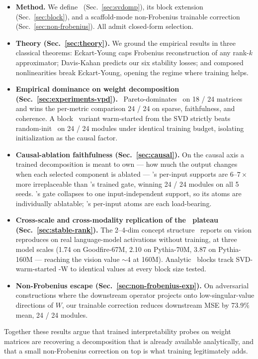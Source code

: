 \begin{itemize}[leftmargin=1.5em, topsep=0.2em, itemsep=0.2em]
\item \textbf{Method.} We define \svdomp\ (Sec.\ \ref{sec:svdomp}), its block extension (Sec.\ \ref{sec:block}), and a scaffold-mode non-Frobenius trainable correction (Sec.\ \ref{sec:non-frobenius}). All admit closed-form selection.

\item \textbf{Theory (Sec.\ \ref{sec:theory}).} We ground the empirical results in three classical theorems: Eckart-Young caps Frobenius reconstruction of any rank-$k$ approximator; Davis-Kahan predicts our six stability losses; and composed nonlinearities break Eckart-Young, opening the regime where training helps.

\item \textbf{Empirical dominance on weight decomposition (Sec.\ \ref{sec:experiments-vpd}).} \svdomp\ Pareto-dominates \vpd\ on 18 / 24 matrices and wins the per-metric comparison 24 / 24 on sparse, faithfulness, and coherence. A block \bsf\ variant warm-started from the SVD strictly beats random-init \bsf\ on 24 / 24 modules under identical training budget, isolating initialization as the causal factor.

\item \textbf{Causal-ablation faithfulness (Sec.\ \ref{sec:causal}).} On the causal axis a trained decomposition is meant to own --- how much the output changes when each selected component is ablated --- \svdomp's per-input supports are $6$--$7\times$ more irreplaceable than \vpd's trained gate, winning 24 / 24 modules on all 5 seeds. \vpd's gate collapses to one input-independent support, so its atoms are individually ablatable; \svdomp's per-input atoms are each load-bearing.

\item \textbf{Cross-scale and cross-modality replication of the \bsf\ plateau (Sec.\ \ref{sec:stable-rank}).} The 2--4-dim concept structure \bsf\ reports on vision reproduces on real language-model activations without training, at three model scales (1.74 on Goodfire-67M, 2.10 on Pythia-70M, 3.87 on Pythia-160M --- reaching the vision value $\sim$4 at 160M). Analytic \svdomp\ blocks track SVD-warm-started \bsf-W to identical values at every block size tested.

\item \textbf{Non-Frobenius escape (Sec.\ \ref{sec:non-frobenius-exp}).} On adversarial constructions where the downstream operator projects onto low-singular-value directions of $W$, our trainable correction reduces downstream MSE by 73.9\% mean, 24 / 24 modules.
\end{itemize}

Together these results argue that trained interpretability probes on weight matrices are recovering a decomposition that is already available analytically, and that a small non-Frobenius correction on top is what training legitimately adds.

